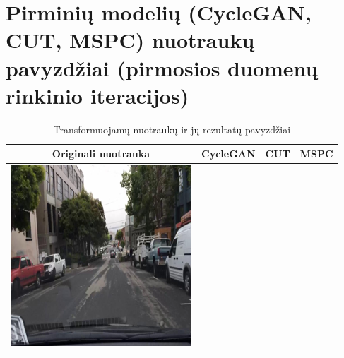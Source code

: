 \documentclass{VUMIFPSbakalaurinis}
\begin{document}
\section{Pirminių modelių (CycleGAN, CUT, MSPC) nuotraukų pavyzdžiai (pirmosios duomenų rinkinio iteracijos)}
    \begin{table}[H]
        \footnotesize
        \centering
        \caption{Transformuojamų nuotraukų ir jų rezultatų pavyzdžiai}
        {\begin{tabular}{|c|c|c|c|} \hline
            Originali nuotrauka & CycleGAN  & CUT  & MSPC\\
            \hline
            \includegraphics[scale=0.35]{img/pvz/1_real} & 

\end{tabular}}
\end{table}
\end{document}

